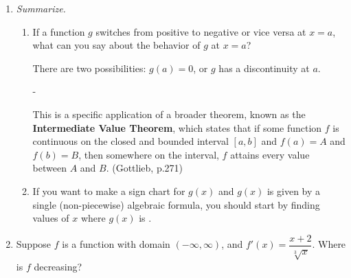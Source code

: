 \documentclass{article}
\makeatletter
\newlength{\tipmargin}
\renewenvironment{framed}{
  \setlength{\tipmargin}{\textwidth-\linewidth}
  \advance\@totalleftmargin-\tipmargin
  \def\FrameCommand{\hspace{\tipmargin}\fbox}%
  \advance\linewidth\tipmargin
  \MakeFramed {\advance\hsize-\width \FrameRestore}%
}
{\endMakeFramed}
\makeatother
\begin{document}
\begin{enumerate}[resume]
\begin{enumerate}
  \end{enumerate}

\item  \emph{Summarize.}

  \begin{enumerate}
  \item

    \begin{problem}[0.5in]
      If a function $g$ switches from positive to negative or vice versa at $x = a$, what can you say about the behavior of $g$ at $x = a$?
    \end{problem}

    \begin{solution}
      There are two possibilities: $g(a) = 0$, or $g$ has a discontinuity at $a$.
    \end{solution}

\begin{framed}
    This is a specific application of a broader theorem, known as the {\bf Intermediate Value Theorem}, which states that if some function $f$ is continuous on the closed and bounded interval $[a, b]$ and $f(a) = A$ and $f(b)=B$, then somewhere on the interval, $f$ attains every value between $A$ and $B$. (Gottlieb, p.271)
\end{framed}
  \item


    \begin{problem}[0.15in]
      If you want to make a sign chart for $g(x)$ and $g(x)$ is given by a single (non-piecewise) algebraic formula, you should start by finding values of $x$ where $g(x)$ is . 
    \end{problem}

  \end{enumerate}

\item 

  \begin{problem}[\vfill]
    Suppose $f$ is a function with domain $(-\infty, \infty)$, and $f'(x) = \dfrac{x + 2}{\sqrt[3]{x}}$. Where is $f$ decreasing?
  \end{problem}


\end{enumerate}
\end{document}
